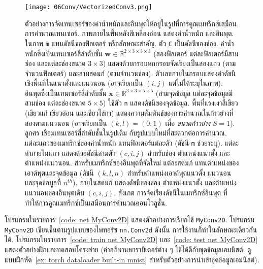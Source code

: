 %
\begin{figure}
\begin{center}
	\texttt{[image: 06Conv/VectorizedConv3.png]}
\end{center}
\caption[ตัวอย่างการจัดเทนเซอร์ให้อยู่ในรูปที่การคูณเมทริกซ์เสมือนการคำนวณเทนเซอร์]{ตัวอย่างการจัดเทนเซอร์ของค่าน้ำหนักและอินพุตให้อยู่ในรูปที่การคูณเมทริกซ์เสมือนการคำนวณเทนเซอร์. 
ภาพภายในพื้นหลังสีเหลืองอ่อน แสดงค่าน้ำหนัก  
และอินพุต.
ในภาพ \texttt{m} แทนดัชนีของฟิลเตอร์ หรือลักษณะสำคัญ.
ตัว \texttt{C} เป็นดัชนีของช่อง.
ค่าน้ำหนักซึ่งเป็นเทนเซอร์สี่ลำดับชั้น
$\bm{w} \in \mathbb{R}^{2 \times 3 \times 3 \times 3}$ (สองฟิลเตอร์ แต่ละฟิลเตอร์มีสามช่อง และแต่ละช่องขนาด $3 \times 3$) แสดงด้วยกรอบหกกรอบจัดเรียงเป็นสองแถว (ตามจำนวนฟิลเตอร์) และสามสดมภ์ (ตามจำนวนช่อง).
ตัวเลขภายในกรอบแสดงค่าดัชนีเชิงพื้นที่ในแนวตั้งและแนวนอน (อาจเรียกเป็น $(i,j)$ แต่ไม่ได้ระบุในภาพ).
อินพุตซึ่งเป็นเทนเซอร์สี่ลำดับชั้น  
$\bm{x} \in \mathbb{R}^{3 \times 3 \times 5 \times 5}$
(สามจุดข้อมูล แต่ละจุดข้อมูลมีสามช่อง แต่ละช่องขนาด $5 \times 5$)
ใช้ตัว \texttt{n} แสดงดัชนีของจุดข้อมูล.
พื้นที่แรงเงาสีเขียว (เขียวแก่ เขียวอ่อน และเขียวไข่กา) แสดงความสัมพันธ์ของการคำนวณในก้าวย่างที่สองตามแนวนอน (อาจเรียกเป็น $(k,l) = (0,1)$ เมื่อ
\textit{ขนาดก้าวย่าง} $S = 1$).
%
ลูกศร เชื่อมเทนเซอร์สี่ลำดับชั้นในรูปเดิม กับรูปแบบใหม่ที่สะดวกต่อการคำนวณ.
แต่ละแถวของเมทริกซ์ของค่าน้ำหนัก
แทนฟิลเตอร์แต่ละตัว (ดัชนี \texttt{m} ช่วยระบุ).
แต่ละค่าภายในแถว แสดงด้วยดัชนีสามตัว $(c,i,j)$ สำหรับช่อง ตำแหน่งแนวตั้ง และตำแหน่งแนวนอน.
สำหรับเมทริกซ์ของอินพุตที่จัดใหม่
แต่ละสดมภ์ แทนตำแหน่งของเอาต์พุตและจุดข้อมูล (ดัชนี $(k,l,n)$ สำหรับตำแหน่งเอาต์พุตแนวตั้ง แนวนอน และจุดข้อมูลที่ $n^{th}$).
ภายในสดมภ์ แสดงดัชนีของช่อง ตำแหน่งแนวตั้ง และตำแหน่งแนวนอนของอินพุตเดิม $(c,i,j)$.
สังเกต การจัดเรียงดัชนีในเมทริกซ์อินพุต ที่ทำให้การคูณเมทริกซ์เป็นเสมือนการคำนวณคอนโวลูชั่น.
}
\label{fig: vectorize conv layer}
\end{figure}
%



โปรแกรมในรายการ~\ref{code: net MyConv2D} แสดงตัวอย่างการเรียกใช้ \texttt{MyConv2D}.
โปรแกรม \texttt{MyConv2D} เขียนขึ้นตามรูปแบบของไพทอร์ช \texttt{nn.Conv2d} 
ดังนั้น การใช้งานก็ทำในลักษณะเดียวกันได้.
โปรแกรมในรายการ~\ref{code: train net MyConv2D}
และ~\ref{code: test net MyConv2D} แสดงตัวอย่างฝึกและทดสอบโครงข่าย 
(ค่าอภิมานพารามิเตอร์ต่าง ๆ ใช้ได้ดีกับชุดข้อมูลเอมนิสต์. ดูแบบฝึกหัด~\ref{ex: torch dataloader built-in mnist} สำหรับตัวอย่างการนำเข้าชุดข้อมูลเอมนิสต์).

